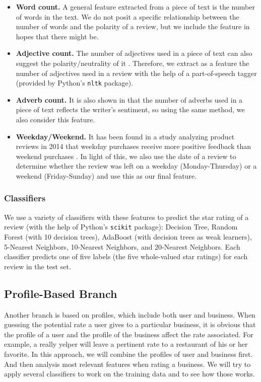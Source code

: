 \begin{itemize}
\item {\bf Word count.} A general feature extracted from a piece of text is the number of words in the text. We do not posit a specific relationship between the number of words and the polarity of a review, but we include the feature in hopes that there might be.

\item {\bf Adjective count.} The number of adjectives used in a piece of text can also suggest the polarity/neutrality of it \cite{adjectives}. Therefore, we extract as a feature the number of adjectives used in a review with the help of a part-of-speech tagger (provided by Python's \texttt{nltk} package).

\item {\bf Adverb count.} It is also shown in \cite{adjectives} that the number of adverbs used in a piece of text reflects the writer's sentiment, so using the same method, we also consider this feature.

\item {\bf Weekday/Weekend.} It has been found in a study analyzing product reviews in 2014 that weekday purchases receive more positive feedback than weekend purchases \cite{online-habit}. In light of this, we also use the date of a review to determine whether the review was left on a weekday (Monday-Thursday) or a weekend (Friday-Sunday) and use this as our final feature.

\end{itemize}

\subsubsection{Classifiers}
We use a variety of classifiers with these features to predict the star rating of a review (with the help of Python's \texttt{scikit} package): Decision Tree, Random Forest (with 10 decision trees), AdaBoost (with decision trees as weak learners), 5-Nearest Neighbors, 10-Nearest Neighbors, and 20-Nearest Neighbors. Each classifier predicts one of five labels (the five whole-valued star ratings) for each review in the test set.

\subsection{Profile-Based Branch}
Another branch is based on profiles, which include both user and business. When guessing the potential rate a user gives to a particular business, it is obvious that the profile of a user and the profile of the business affect the rate associated. For example, a really yelper will leave a pertinent rate to a restaurant of his or her favorite. In this approach, we will combine the profiles of user and business first. And then analysis most relevant features when rating a business. We will try to apply several classifiers to work on the training data and to see how those works.

